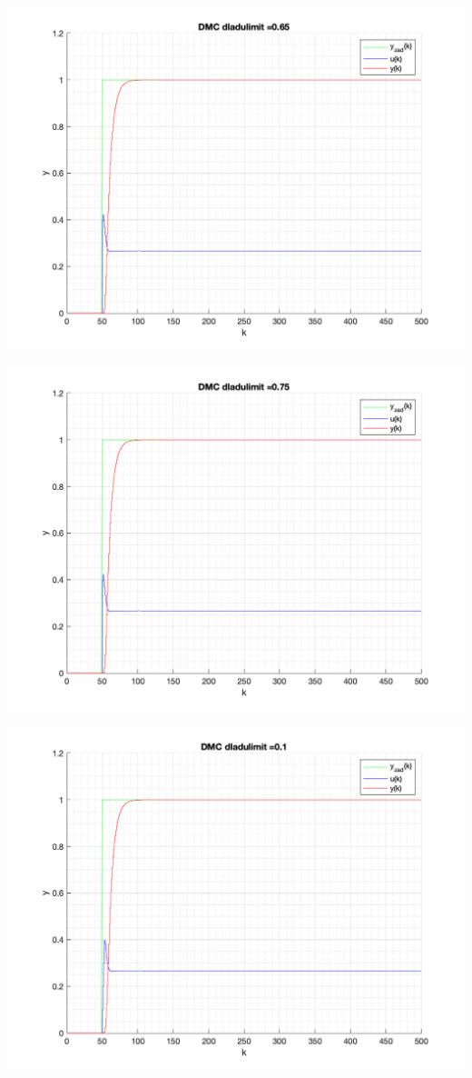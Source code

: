 \documentclass[a4paper, 11pt]{article}
\begin{document}
\begin{enumerate}
 \includegraphics[width=\linewidth]{./ModelsP6_dulimit/P4_DMC_dulimit_0_65_png.png} 
 
 \includegraphics[width=\linewidth]{./ModelsP6_dulimit/P4_DMC_dulimit_0_75_png.png} 
 
 \includegraphics[width=\linewidth]{./ModelsP6_dulimit/P4_DMC_dulimit_0_1_png.png} 
 

\end{enumerate}
\end{document}
